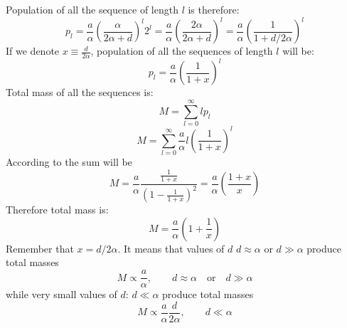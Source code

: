 \documentclass[journal=jacsat,manuscript=article,layout=twocolumn]{achemso}
\newcommand*{\ga}{\alpha}
\newcommand*{\pt}[1]{\left( #1\right)}
\begin{document}
Population of all the sequence of length $l$ is therefore:
  \begin{equation}
    p_l=\frac{a}{\ga}\pt{\frac{\ga}{2\ga+d}}^l2^l=\frac{a}{\ga}\pt{\frac{2\ga}{2\ga+d}}^l=
    \frac{a}{\ga}\pt{\frac{1}{1+d/2\ga}}^l
  \end{equation} 
If we denote $x\equiv\frac{d}{2\ga}$, population of all the sequences of length $l$ will be:
\begin{equation}
\boxed{ p_l=\frac{a}{\ga}\pt{\frac{1}{1+x}}^l}
\end{equation} 
Total mass of all the sequences is:
\begin{equation}
 M=\sum_{l=0}^{\infty}lp_l
\end{equation} 
\begin{equation}
 M=\sum_{l=0}^{\infty}\frac{a}{\ga}l\pt{\frac{1}{1+x}}^l
\end{equation} 
According to \cite{Gradstein1980} the sum will be
\begin{equation}
 M=\frac{a}{\ga}\frac{\frac{1}{1+x}}{\pt{1-\frac{1}{1+x}}^2}=\frac{a}{\ga}\pt{\frac{1+x}{x}}
\end{equation}
Therefore total mass is:
  \begin{equation}
   M=\frac{a}{\ga}\pt{1+\frac{1}{x}}
  \end{equation} 
Remember that $x=d/2\ga$. It means that values of $d$ $d\approx \ga$ or $d\gg \ga$ produce total 
masses 
\begin{equation}
 M\propto\frac{a}{\ga}, \qquad d\approx \ga\quad \mbox{or}\quad d\gg \ga
\end{equation} 
while very small values of $d:\,d\ll\ga$ produce total masses 
\begin{equation}
M\propto \frac{a}{\ga}\frac{d}{2\ga} ,\qquad d\ll\ga
\end{equation}



 

\end{document}
